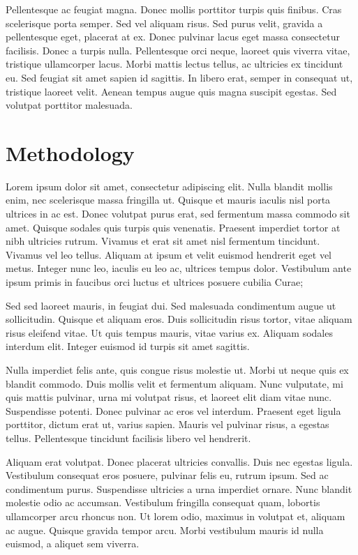 \documentclass{article}[12pt,a4paper]
\begin{document}
Pellentesque ac feugiat magna. 
Donec mollis porttitor turpis quis finibus. 
Cras scelerisque porta semper. 
Sed vel aliquam risus. 
Sed purus velit, gravida a pellentesque eget, placerat at ex. 
Donec pulvinar lacus eget massa consectetur facilisis. 
Donec a turpis nulla. 
Pellentesque orci neque, laoreet quis viverra vitae, tristique ullamcorper lacus. 
Morbi mattis lectus tellus, ac ultricies ex tincidunt eu. 
Sed feugiat sit amet sapien id sagittis. 
In libero erat, semper in consequat ut, tristique laoreet velit. 
Aenean tempus augue quis magna suscipit egestas. 
Sed volutpat porttitor malesuada. 

\section{Methodology}

Lorem ipsum dolor sit amet, consectetur adipiscing elit. 
Nulla blandit mollis enim, nec scelerisque massa fringilla ut. 
Quisque et mauris iaculis nisl porta ultrices in ac est. 
Donec volutpat purus erat, sed fermentum massa commodo sit amet. 
Quisque sodales quis turpis quis venenatis. 
Praesent imperdiet tortor at nibh ultricies rutrum. 
Vivamus et erat sit amet nisl fermentum tincidunt. 
Vivamus vel leo tellus. 
Aliquam at ipsum et velit euismod hendrerit eget vel metus. 
Integer nunc leo, iaculis eu leo ac, ultrices tempus dolor. 
Vestibulum ante ipsum primis in faucibus orci luctus et ultrices posuere 
cubilia Curae;

Sed sed laoreet mauris, in feugiat dui. 
Sed malesuada condimentum augue ut sollicitudin. 
Quisque et aliquam eros. 
Duis sollicitudin risus tortor, vitae aliquam risus eleifend vitae. 
Ut quis tempus mauris, vitae varius ex. 
Aliquam sodales interdum elit. 
Integer euismod id turpis sit amet sagittis.

Nulla imperdiet felis ante, quis congue risus molestie ut. 
Morbi ut neque quis ex blandit commodo. 
Duis mollis velit et fermentum aliquam. 
Nunc vulputate, mi quis mattis pulvinar, urna mi volutpat risus, 
et laoreet elit diam vitae nunc. Suspendisse potenti. 
Donec pulvinar ac eros vel interdum. 
Praesent eget ligula porttitor, dictum erat ut, varius sapien. 
Mauris vel pulvinar risus, a egestas tellus. 
Pellentesque tincidunt facilisis libero vel hendrerit.

Aliquam erat volutpat. 
Donec placerat ultricies convallis. 
Duis nec egestas ligula. 
Vestibulum consequat eros posuere, pulvinar felis eu, rutrum ipsum. 
Sed ac condimentum purus. 
Suspendisse ultricies a urna imperdiet ornare. 
Nunc blandit molestie odio ac accumsan. 
Vestibulum fringilla consequat quam, lobortis ullamcorper arcu rhoncus non. 
Ut lorem odio, maximus in volutpat et, aliquam ac augue. 
Quisque gravida tempor arcu. 
Morbi vestibulum mauris id nulla euismod, a aliquet sem viverra.
\end{document}
